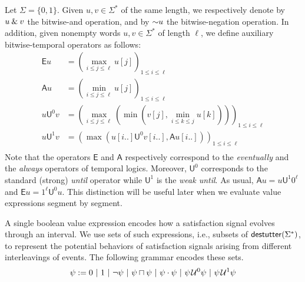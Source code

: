 Let $\Sigma = \{0,1\}$.
Given $u,v \in \Sigma^*$ of the same length, we respectively denote by $u \mathbin{\&} v$ the bitwise-and operation, and by $\mathord{\sim} u$ the bitwise-negation operation.
In addition, given nonempty words $u,v \in \Sigma^*$ of length $\ell$, we define auxiliary bitwise-temporal operators as follows:
\begin{align*}
\mathsf{E} u &= \left( \max_{i \leq j \leq \ell} u[j] \right)_{1 \leq i \leq \ell} \\
\mathsf{A} u &= \left( \min_{i \leq j \leq \ell} u[j] \right)_{1 \leq i \leq \ell} \\
u \mathsf{U}^0 v &= \left( \max_{i \leq j \leq \ell} \left( \min \left( v[j], \min_{i \leq k \leq j} u[k] \right) \right) \right)_{1 \leq i \leq \ell} \\
u \mathsf{U}^1 v &= \left( \max \left( u[i..] \mathsf{U}^0 v[i..], \mathsf{A} u[i..] \right) \right)_{1 \leq i \leq \ell} \\
\end{align*}
Note that the operators $\mathsf{E}$ and $\mathsf{A}$ respectively correspond to the \emph{eventually} and the \emph{always} operators of temporal logics.
Moreover, $\mathsf{U}^0$ corresponds to the standard (strong) \emph{until} operator while $\mathsf{U}^1$ is the \emph{weak until}.
As usual, $\mathsf{A} u = u \mathsf{U}^1 0^\ell$ and $\mathsf{E} u = 1^\ell \mathsf{U}^0 u$.
This distinction will be useful later when we evaluate value expressions segment by segment.

A single boolean value expression encodes how a satisfaction signal evolves through an interval.
We use sets of such expressions, i.e., subsets of $\mathsf{destutter}(\Sigma^*)$, to represent the potential behaviors of satisfaction signals arising from different interleavings of events.
The following grammar encodes these sets.
$$ \psi := 0 ~|~ 1 ~|~ \lnot \psi  ~|~ \psi \sqcap \psi ~|~ \psi \cdot \psi ~|~ \psi \kern.1em\mathcal{U}^0 \psi ~|~ \psi \kern.1em\mathcal{U}^1 \psi $$ %

